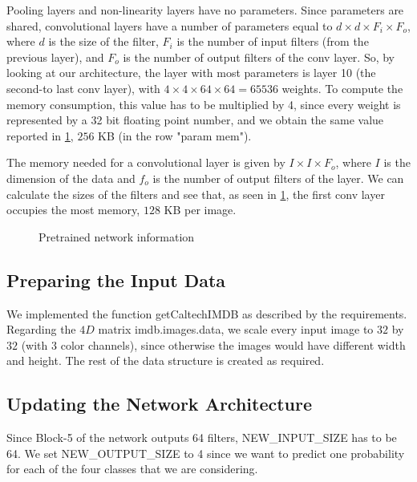 \documentclass{article}
\begin{document}
Pooling layers and non-linearity layers have no parameters. Since parameters are shared, convolutional layers have a number of parameters equal to $d \times d \times F_i \times F_o$, where $d$ is the size of the filter, $F_i$ is the number of input filters (from the previous layer), and $F_o$ is the number of output filters of the conv layer. So, by looking at our architecture, the layer with most parameters is layer 10 (the second-to last conv layer), with $4 \times 4 \times 64 \times 64 = 65536$ weights. To compute the memory consumption, this value has to be multiplied by 4, since every weight is represented by a 32 bit floating point number, and we obtain the same value reported in \cref{fig:memtable}, $256$ KB (in the row "param mem"). 

The memory needed for a convolutional layer is given by $I \times I \times F_o$, where $I$ is the dimension of the data and $f_o$ is the number of output filters of the layer. We can calculate the sizes of the filters and see that, as seen in \cref{fig:memtable}, the first conv layer occupies the most memory, $128$ KB per image.


\begin{figure}[h]
    \centering
    \caption{Pretrained network information}
\label{fig:memtable}
\end{figure}

\subsection{Preparing the Input Data}

We implemented the function getCaltechIMDB as described by the requirements. Regarding the $4D$ matrix imdb.images.data, we scale every input image to $32$ by $32$ (with 3 color channels), since otherwise the images would have different width and height. The rest of the data structure is created as required.

\subsection{Updating the Network Architecture}

Since Block-5 of the network outputs 64 filters, NEW\_INPUT\_SIZE has to be 64.
We set NEW\_OUTPUT\_SIZE to 4 since we want to predict one probability for each of the four classes that we are considering. %
\end{document}
